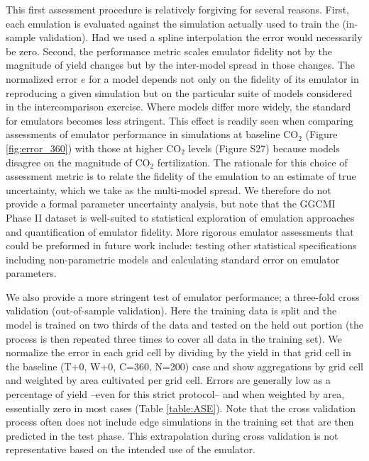 \documentclass[gmd, manuscript]{copernicus} %
\begin{document}
This first assessment procedure is relatively forgiving for several reasons. 
First, each emulation is evaluated against the simulation actually used to train the  (in-sample validation). 
Had we used a spline interpolation the error would necessarily be zero. 
Second, the performance metric scales emulator fidelity not by the magnitude of yield changes but by the inter-model spread in those changes. 
The normalized error $e$ for a model depends not only on the fidelity of its emulator in reproducing a given simulation but on the particular suite of models considered in the intercomparison exercise. 
Where models differ more widely, the standard for emulators becomes less stringent. 
This effect is readily seen when comparing assessments of emulator performance in simulations at baseline CO$_2$ (Figure \ref{fig:error_360}) with those at higher CO$_2$ levels (Figure S27) because models disagree on the magnitude of CO$_2$ fertilization. 
The rationale for this choice of assessment metric is to relate the fidelity of the emulation to an estimate of true uncertainty, which we take as the multi-model spread. 
We therefore do not provide a formal parameter uncertainty analysis, but note that the GGCMI Phase II dataset is well-suited to statistical exploration of emulation approaches and quantification of emulator fidelity. 
More rigorous emulator assessments that could be preformed in future work include: testing other statistical specifications including non-parametric models and calculating standard error on emulator parameters.

We also provide a more stringent test of emulator performance; a three-fold cross validation (out-of-sample validation). 
Here the training data is split and the model is trained on two thirds of the data and tested on the held out portion (the process is then repeated three times to cover all data in the training set). 
We normalize the error in each grid cell by dividing by the yield in that grid cell in the baseline (T+0, W+0, C=360, N=200) case and show aggregations by grid cell and weighted by area cultivated per grid cell. 
Errors are generally low as a percentage of yield --even for this strict protocol-- and when weighted by area, essentially zero in most cases (Table \ref{table:ASE}). 
Note that the cross validation process often does not include edge simulations in the training set that are then predicted in the test phase. 
This extrapolation during cross validation is not representative based on the intended use of the emulator.
\end{document}

